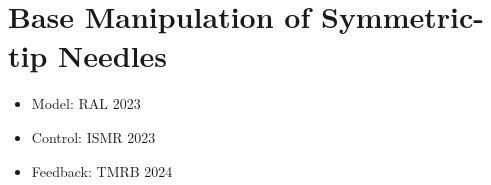 \chapter{Base Manipulation of Symmetric-tip Needles} \label{chap:chap-3}

\begin{itemize}
\item Model: RAL 2023
\item Control: ISMR 2023
\item Feedback: TMRB 2024
\end{itemize}


